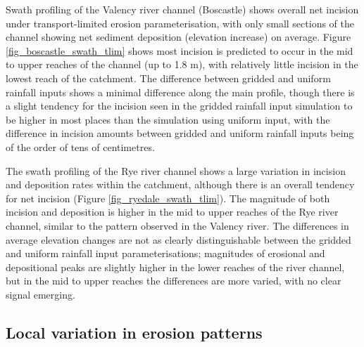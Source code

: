 Swath profiling of the Valency river channel (Boscastle) shows overall net incision under transport-limited erosion parameterisation, with only small sections of the channel showing net sediment deposition (elevation increase) on average. Figure \ref{fig_boscastle_swath_tlim} shows most incision is predicted to occur in the mid to upper reaches of the channel (up to 1.8 m), with relatively little incision in the lowest reach of the catchment. The difference between gridded and uniform rainfall inputs shows a minimal difference along the main profile, though there is a slight tendency for the incision seen in the gridded rainfall input simulation to be higher in most places than the simulation using uniform input, with the difference in incision amounts between gridded and uniform rainfall inputs being of the order of tens of centimetres.

The swath profiling of the Rye river channel shows a large variation in incision and deposition rates within the catchment, although there is an overall tendency for net incision (Figure \ref{fig_ryedale_swath_tlim}). The magnitude of both incision and deposition is higher in the mid to upper reaches of the Rye river channel, similar to the pattern observed in the Valency river. The differences in average elevation changes are not as clearly distinguishable between the gridded and uniform rainfall input parameterisations; magnitudes of erosional and depositional peaks are slightly higher in the lower reaches of the river channel, but in the mid to upper reaches the differences are more varied, with no clear signal emerging. 
 
%
%


\subsection{Local variation in erosion patterns}


